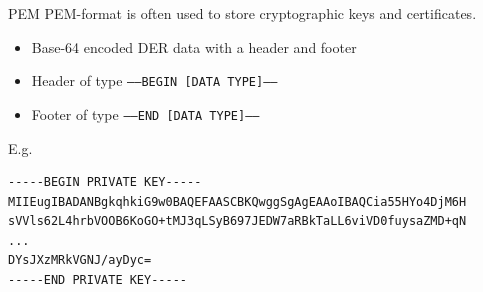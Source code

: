\begin{frame}[fragile]{PEM}
  PEM-format is often used to store cryptographic keys and certificates.
  \pause
  \begin{itemize}
    \item Base-64 encoded DER data with a header and footer
    \item Header of type \texttt{-----BEGIN [DATA TYPE]-----}
    \item Footer of type \texttt{-----END [DATA TYPE]-----}
  \end{itemize}

  \pause
  E.g.
  \begin{Verbatim}[fontsize=\scriptsize]
-----BEGIN PRIVATE KEY-----
MIIEugIBADANBgkqhkiG9w0BAQEFAASCBKQwggSgAgEAAoIBAQCia55HYo4DjM6H
sVVls62L4hrbVOOB6KoGO+tMJ3qLSyB697JEDW7aRBkTaLL6viVD0fuysaZMD+qN
...
DYsJXzMRkVGNJ/ayDyc=
-----END PRIVATE KEY-----
  \end{Verbatim}
\end{frame}


